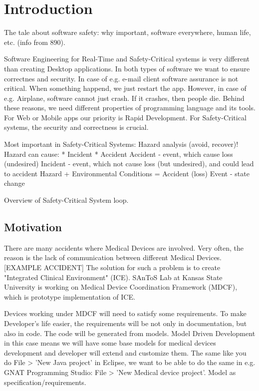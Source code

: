 
\cleardoublepage


\chapter{Introduction}
\label{introduction}

The tale about software safety: why important, software everywhere, human life, etc. (info from 890).

Software Engineering for Real-Time and Safety-Critical systems is very different than creating Desktop applications. In both types of software we want to ensure correctnes and security. In case of e.g. e-mail client software assurance is not critical. When something happend, we just restart the app. However, in case of e.g. Airplane, software cannot just crash. If it crashes, then people die. Behind these reasons, we need different properties of programming language and its tools. For Web or Mobile apps our priority is Rapid Development. For Safety-Critical systems, the security and correctness is crucial.


Most important in Safety-Critical Systems: Hazard analysis (avoid, recover)!
Hazard can cause:
	* Incident
	* Accident
Accident - event, which cause loss (undesired)
Incident - event, which not cause loss (but undesired), and could lead to accident
Hazard + Environmental Conditions = Accident (loss)
Event - state change

Overview of Safety-Critical System loop.

\section{Motivation}
\label{introduction:motivation}
There are many accidents where Medical Devices are involved. Very often, the reason is the lack of communication between different Medical Devices. [EXAMPLE ACCIDENT]
The solution for such a problem is to create "Integrated Clinical Environment" (ICE). SAnToS Lab at Kansas State University is working on Medical Device Coordination Framework (MDCF), which is prototype implementation of ICE.  

Devices working under MDCF will need to satisfy some requirements. To make Developer's life easier, the requirements will be not only in documentation, but also in code. The code will be generated from models.
Model Driven Development in this case means we will have some base models for medical devices development and developer will extend and customize them. The same like you do File > 'New Java project' in Eclipse, we want to be able to do the same in e.g. GNAT Programming Studio: File > 'New Medical device project'.
Model as specification/requirements.

